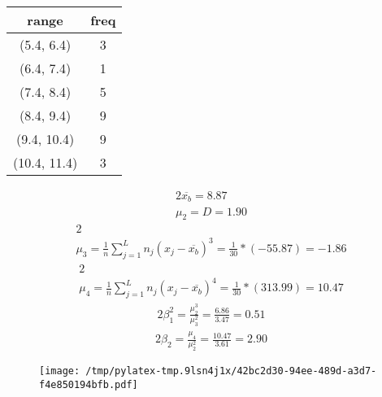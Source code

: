 \documentclass{article}%
\begin{document}
%
\normalsize%
\begin{tabular}{c|c}
\toprule
       range &  freq \\
\midrule
  (5.4, 6.4) &     3 \\
  (6.4, 7.4) &     1 \\
  (7.4, 8.4) &     5 \\
  (8.4, 9.4) &     9 \\
 (9.4, 10.4) &     9 \\
(10.4, 11.4) &     3 \\
\bottomrule
\end{tabular}
%
\begin{alignat*}{2}%
\overline {{ x_{{b}} }} = 8.87%
\\ \mu_2 = D = 1.90%
\end{alignat*}%
\begin{alignat*}{2}%
\\ \mu_3
            = \frac 1 n \sum\limits_{j = 1}^L {n_j (x_j - \overline {{ x_{{b}} }})^3}
            = \frac 1 { 30 } * (-55.87)
            = -1.86
\end{alignat*}%
\begin{alignat*}{2}%
\\ \mu_4
            = \frac 1 n \sum\limits_{j = 1}^L {n_j (x_j - \overline {{ x_{{b}} }})^4}
            = \frac 1 { 30 } * (313.99)
            = 10.47
\end{alignat*}%
\begin{alignat*}{2}%
\beta_1^2
            = \frac {\mu_2^3} {\mu_3^2}
            = \frac {6.86} {3.47}
            = 0.51
\end{alignat*}%
\begin{alignat*}{2}%
\beta_2
            = \frac {\mu_4} {\mu_2^2}
            = \frac {10.47} {3.61}
            = 2.90
\end{alignat*}%


\begin{figure}[H]%
\centering%
\texttt{[image: /tmp/pylatex-tmp.9lsn4j1x/42bc2d30-94ee-489d-a3d7-f4e850194bfb.pdf]}%
\end{figure}

%
\end{document}

